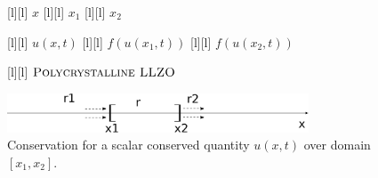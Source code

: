 \begin{figure}[ht]
	\centering
	\footnotesize

	[l] {$x$}
	[l] {$x_1$}
	[l] {$x_2$}

	[l] {$u(x,t)$}
	[l] {$f(u(x_{1},t))$}
	[l] {$f(u(x_{2},t))$}


	[l] {$\textsc{Polycrystalline LLZO}$}

	\includegraphics[width=0.8\textwidth]{massx1x2_u.eps}
	\caption{Conservation for a scalar conserved quantity $u(x,t)$ over domain $[x_1,x_2]$.}
	\label{\LABEL}
\end{figure}
